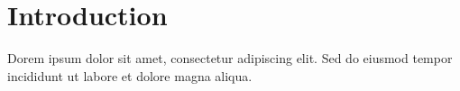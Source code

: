 \section{Introduction}
Dorem ipsum dolor sit amet, consectetur adipiscing elit.
Sed do eiusmod tempor incididunt ut labore et dolore magna aliqua. 